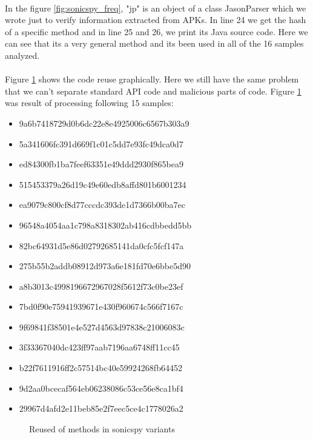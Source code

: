 \documentclass[../main.tex]{subfile}
\begin{document}
		\paragraph{} In the figure \ref{fig:sonicspy_freq}, "jp" is an object of a class JasonParser which we wrote just to verify information extracted from APKs. In line 24 we get the hash of a specific method and in line 25 and 26, we print its Java source code. Here we can see that its a very general method and its been used in all of the 16 samples analyzed.
		
		\paragraph{} Figure \ref{fig:sonicspy_graph} shows the code reuse graphically. Here we still have the same problem that we can't separate standard API code and malicious parts of code. Figure \ref{fig:sonicspy_graph} was result of processing following 15 samples:
		\begin{itemize}
			\item 9a6b7418729d0b6dc22e8e4925006c6567b303a9
			\item 5a341606fc391d669f1c01c5dd7e93fc49dca0d7
			\item ed84300fb1ba7feef63351e49ddd2930f865bea9
			\item 515453379a26d19c49e60edb8affd801b6001234
			\item ea9079c800cf8d77cccdc393de1d7366b00ba7ec
			\item 96548a4054aa1c798a8318302ab416cdbbedd5bb
			\item 82bc64931d5e86d02792685141da0cfc5fcf147a
			\item 275b55b2addb08912d973a6e181fd70e6bbe5d90
			\item a8b3013c4998196672967028f5612f73c0be23ef
			\item 7bd0f90e75941939671e430f960674c566f7167c
			\item 9f69841f38501e4e527d4563d97838c21006083c
			\item 3f33367040dc423ff97aab7196aa6748ff11cc45
			\item b22f7611916ff2c57514bc40e59924268fb64452
			\item 9d2aa0bcecaf564eb06238086c53ce56e8ca1bf4
			\item 29967d4afd2e11beb85e2f7eec5ce4c1778026a2
		\end{itemize}
		
		\begin{figure}[h]
			\centering
			\caption{Reused of methods in sonicspy variants}
			\label{fig:sonicspy_graph}			
		\end{figure}
		
\end{document}
